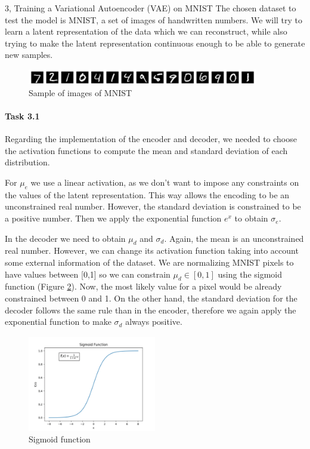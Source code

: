 \begin{task}{3, Training a Variational Autoencoder (VAE) on MNIST}
The chosen dataset to test the model is MNIST, a set of images of handwritten numbers. We will try to learn a latent representation of the data which we can reconstruct, while also trying to make the latent representation continuous enough to be able to generate new samples.

\begin{figure}[H]
    \centering
    \includegraphics[width=0.9\textwidth]{images/mnist.png}
    \caption{Sample of images of MNIST}
    \label{mnistsample}
\end{figure}

\paragraph{Task 3.1} Regarding the implementation of the encoder and decoder, we needed to choose the activation functions to compute the mean and standard deviation of each distribution. 

For \(\mu_e\) we use a linear activation, as we don't want to impose any constraints on the values of the latent representation. This way allows the encoding to be an unconstrained real number. However, the standard deviation is constrained to be a positive number. Then we apply the exponential function \(e^x\) to obtain \(\sigma_e\).

In the decoder we need to obtain \(\mu_d\) and \(\sigma_d\). Again, the mean is an unconstrained real number. However, we can change its activation function taking into account some external information of the dataset. We are normalizing MNIST pixels to have values between [0,1] so we can constrain \(\mu_d \in [0,1]\) using the sigmoid function (Figure \ref{sigmoid}). Now, the most likely value for a pixel would be already constrained between 0 and 1. On the other hand, the standard deviation for the decoder follows the same rule than in the encoder, therefore we again apply the exponential function to make \(\sigma_d\) always positive.

\begin{figure}[H]
    \centering
    \includegraphics[width=0.5\textwidth]{images/sigmoid-function.png}
    \caption{Sigmoid function}
    \label{sigmoid}
\end{figure}


\end{task}
